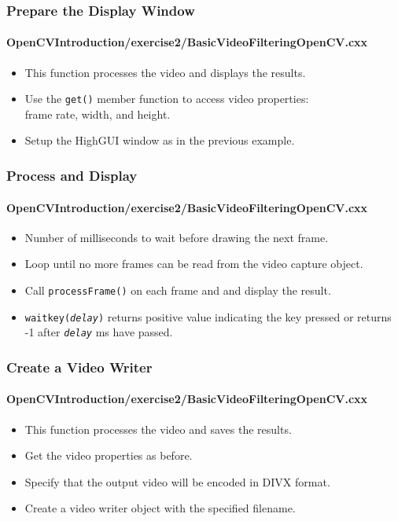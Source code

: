 \begin{frame}
\frametitle{Prepare the Display Window}
\framesubtitle{OpenCVIntroduction/exercise2/BasicVideoFilteringOpenCV.cxx}
\begin{center}
\begin{itemize}
\item This function processes the video and displays the results.
\pause
\item Use the {\tt\small get()} member function to access video properties: \\
      frame rate, width, and height.
\pause
\item Setup the HighGUI window as in the previous example.
\end{itemize}
\end{center}
\end{frame}


\begin{frame}
\frametitle{Process and Display}
\framesubtitle{OpenCVIntroduction/exercise2/BasicVideoFilteringOpenCV.cxx}
\begin{center}
\begin{itemize}
\item Number of milliseconds to wait before drawing the next frame.
\pause
\item Loop until no more frames can be read from the video capture object.
\item Call {\tt\small processFrame()} on each frame and and display the result.
\item {\tt waitkey(\emph{delay})} returns positive value indicating the key pressed
      or returns -1 after {\tt \emph{delay}} ms have passed.
\end{itemize}
\end{center}
\end{frame}


\begin{frame}
\frametitle{Create a Video Writer}
\framesubtitle{OpenCVIntroduction/exercise2/BasicVideoFilteringOpenCV.cxx}
\begin{center}
\begin{itemize}
\item This function processes the video and saves the results.
\pause
\item Get the video properties as before.
\pause
\item Specify that the output video will be encoded in DIVX format.
\item Create a video writer object with the specified filename.
\end{itemize}
\end{center}
\end{frame}


